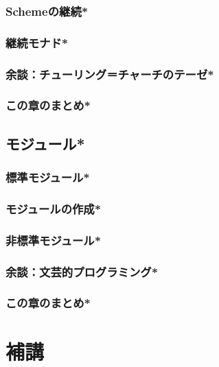 \documentclass[a5paper,twoside,fleqn,draft]{jsbook}
\newcommand{\programminglanguage}[1]{\textsf{#1}}
\newcommand{\scheme}{\programminglanguage{Scheme}}
\begin{document}
\section{\scheme の継続*}
\section{継続モナド*}
\section{余談：チューリング＝チャーチのテーゼ*}
\section{この章のまとめ*}

\chapter{モジュール*}
\section{標準モジュール*}
\section{モジュールの作成*}
\section{非標準モジュール*}
\section{余談：文芸的プログラミング*}
\section{この章のまとめ*}

\part{補講}
\end{document}
